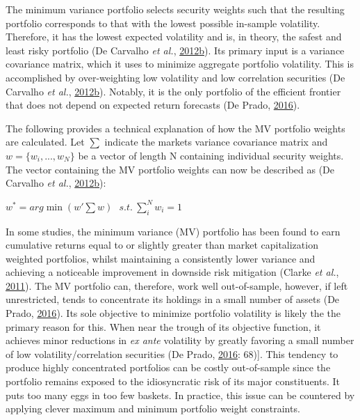 \documentclass[11pt,preprint, authoryear]{elsarticle}
\numberwithin{equation}{section}
\numberwithin{figure}{section}
\numberwithin{table}{section}
\begin{document}
The minimum variance portfolio selects security weights such that the
resulting portfolio corresponds to that with the lowest possible
in-sample volatility. Therefore, it has the lowest expected volatility
and is, in theory, the safest and least risky portfolio (De Carvalho
\emph{et al.},
\protect\hyperlink{ref-rawl2012}{2012}\protect\hyperlink{ref-rawl2012}{b}).
Its primary input is a variance covariance matrix, which it uses to
minimize aggregate portfolio volatility. This is accomplished by
over-weighting low volatility and low correlation securities (De
Carvalho \emph{et al.},
\protect\hyperlink{ref-rawl2012}{2012}\protect\hyperlink{ref-rawl2012}{b}).
Notably, it is the only portfolio of the efficient frontier that does
not depend on expected return forecasts (De Prado,
\protect\hyperlink{ref-lopez}{2016}).

The following provides a technical explanation of how the MV portfolio
weights are calculated. Let \(\sum\) indicate the markets variance
covariance matrix and \(w=\{w_i,..., w_N \}\) be a vector of length N
containing individual security weights. The vector containing the MV
portfolio weights can now be described as (De Carvalho \emph{et al.},
\protect\hyperlink{ref-rawl2012}{2012}\protect\hyperlink{ref-rawl2012}{b}):

\begin{center}
$w^*=arg\min(w'\sum w)\ \ \ s.t.\ \sum^N_iw_i=1$ 
\end{center}

In some studies, the minimum variance (MV) portfolio has been found to
earn cumulative returns equal to or slightly greater than market
capitalization weighted portfolios, whilst maintaining a consistently
lower variance and achieving a noticeable improvement in downside risk
mitigation (Clarke \emph{et al.},
\protect\hyperlink{ref-clarke2011}{2011}). The MV portfolio can,
therefore, work well out-of-sample, however, if left unrestricted, tends
to concentrate its holdings in a small number of assets (De Prado,
\protect\hyperlink{ref-lopez}{2016}). Its sole objective to minimize
portfolio volatility is likely the the primary reason for this. When
near the trough of its objective function, it achieves minor reductions
in \emph{ex ante} volatility by greatly favoring a small number of low
volatility/correlation securities (De Prado,
\protect\hyperlink{ref-lopez}{2016}: 68){]}. This tendency to produce
highly concentrated portfolios can be costly out-of-sample since the
portfolio remains exposed to the idiosyncratic risk of its major
constituents. It puts too many eggs in too few baskets. In practice,
this issue can be countered by applying clever maximum and minimum
portfolio weight constraints.
\end{document}
